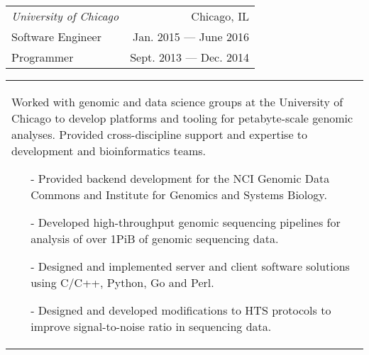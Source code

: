 \begin{tabularx}{\textwidth}{L R}
    \normalsize\textit{University of Chicago} & Chicago, IL \\
    \hspace{10pt}Software Engineer & Jan. 2015 --- June 2016 \\
    \hspace{10pt}Programmer & Sept. 2013 --- Dec. 2014 \\
\end{tabularx}
\begin{tabularx}{\textwidth}{X}
    \vspace{1pt}
    Worked with genomic and data science groups at the University of Chicago to develop platforms and tooling for petabyte-scale genomic analyses. Provided cross-discipline support and expertise to development and bioinformatics teams.
    \begin{itemize}
        \itemsep{}
        \item[-] Provided backend development for the NCI Genomic Data Commons and Institute for Genomics and Systems Biology.
        \item[-] Developed high-throughput genomic sequencing pipelines for analysis of over 1PiB of genomic sequencing data.
        \item[-] Designed and implemented server and client software solutions using C/C++, Python, Go and Perl.
        \item[-] Designed and developed modifications to HTS protocols to improve signal-to-noise ratio in sequencing data.
    \end{itemize}
\end{tabularx}
